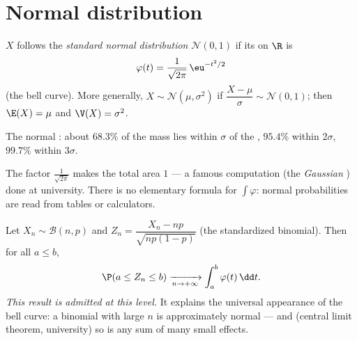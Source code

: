 \section{Normal distribution}

\begin{definition}\label{def:g12:contdist:normal}
$X$ follows the \emph{standard normal distribution} $\mathcal N(0, 1)$ if its  on $\R$ is
\[
\varphi(t) = \frac{1}{\sqrt{2\pi}}\,\eu^{-t^2/2}
\]
(the bell curve). More generally,
$X \sim \mathcal N(\mu, \sigma^2)$ if $\dfrac{X - \mu}{\sigma} \sim
\mathcal N(0,1)$; then $\E(X) = \mu$ and $\V(X) = \sigma^2$.
\end{definition}

\begin{omfigure}

{\small The normal : about $68.3\%$ of the mass lies within
$\sigma$ of the , $95.4\%$ within $2\sigma$, $99.7\%$ within
$3\sigma$.}
\end{omfigure}

\begin{remark}
The factor $\frac{1}{\sqrt{2\pi}}$ makes the total area $1$ --- a famous
computation (the \emph{Gaussian }) done at university. There is no
elementary formula for $\int \varphi$: normal probabilities are read from
tables or calculators.
\end{remark}

\begin{theorem}\label{thm:g12:contdist:tcl}
Let $X_n \sim \mathcal B(n, p)$ and
$Z_n = \dfrac{X_n - np}{\sqrt{np(1-p)}}$ (the standardized binomial). Then
for all $a \leq b$,
\[
\P(a \leq Z_n \leq b) \xrightarrow[n\to+\infty]{}
\int_a^b \varphi(t)\,\dd t .
\]
\emph{This result is admitted at this level.} It explains the universal
appearance of the bell curve: a binomial with large $n$ is approximately
normal --- and (central limit theorem, university) so is any sum of many small
 effects.
\end{theorem}

